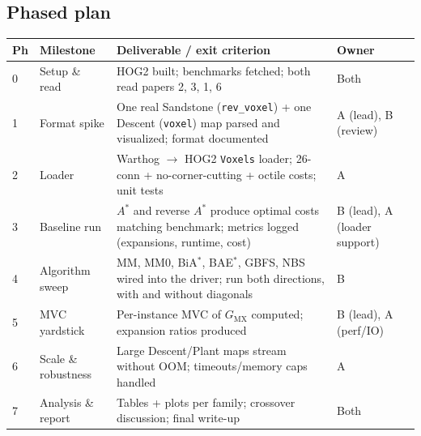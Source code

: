 \documentclass[11pt]{article}
\newcommand{\GMX}{G_{\mathrm{MX}}}
\begin{document}
\subsection{Phased plan}
\renewcommand{\arraystretch}{1.25}
\begin{longtable}{@{}p{0.6cm}p{3.2cm}p{5.0cm}p{2.6cm}@{}}
\toprule
\textbf{Ph} & \textbf{Milestone} & \textbf{Deliverable / exit criterion} & \textbf{Owner}\\
\midrule
0 & Setup \& read & HOG2 built; benchmarks fetched; both read papers 2, 3, 1, 6 & Both\\
1 & Format spike & One real Sandstone (\texttt{rev\_voxel}) + one Descent (\texttt{voxel}) map parsed and visualized; format documented & A (lead), B (review)\\
2 & Loader & Warthog $\to$ HOG2 \texttt{Voxels} loader; 26-conn + no-corner-cutting + octile costs; unit tests & A\\
3 & Baseline run & $A^{*}$ and reverse $A^{*}$ produce optimal costs matching benchmark; metrics logged (expansions, runtime, cost) & B (lead), A (loader support)\\
4 & Algorithm sweep & MM, MM0, BiA$^{*}$, BAE$^{*}$, GBFS, NBS wired into the driver; run both directions, with and without diagonals & B\\
5 & MVC yardstick & Per-instance MVC of $\GMX$ computed; expansion ratios produced & B (lead), A (perf/IO)\\
6 & Scale \& robustness & Large Descent/Plant maps stream without OOM; timeouts/memory caps handled & A\\
7 & Analysis \& report & Tables + plots per family; crossover discussion; final write-up & Both\\
\bottomrule
\end{longtable}
\end{document}
